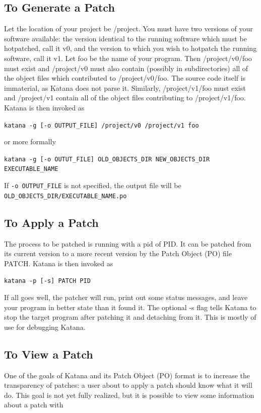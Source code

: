 \documentclass[11pt]{article}
\begin{document}
\subsection{To Generate a Patch}
\label{sec-6.2}

   Let the location of your project be /project. You must have two
   versions of your software available: the version identical to the
   running software which must be hotpatched, call it v0, and the
   version to which you wish to hotpatch the running software, call it
   v1. Let foo be the name of your program. Then /project/v0/foo must
   exist and /project/v0 must also contain (possibly in
   subdirectories) all of the object files which contributed to
   /project/v0/foo. The source code itself is immaterial, as Katana
   does not parse it. Similarly, /project/v1/foo must exist and
   /project/v1 contain all of the object files contributing to
   /project/v1/foo. Katana is then invoked as

   \texttt{katana -g [-o OUTPUT\_FILE] /project/v0 /project/v1 foo}

   or more formally

   \texttt{katana -g [-o OUTUT\_FILE] OLD\_OBJECTS\_DIR NEW\_OBJECTS\_DIR EXECUTABLE\_NAME}

   If \texttt{-o OUTPUT\_FILE} is not specified, the output file will be \texttt{OLD\_OBJECTS\_DIR/EXECUTABLE\_NAME.po}
\subsection{To Apply a Patch}
\label{sec-6.3}

   The process to be patched is running with a pid of PID. It can be
   patched from its current version to a more recent version by the
   Patch Object (PO) file PATCH. Katana is then invoked as

   \texttt{katana -p [-s] PATCH PID}

   If all goes well, the patcher will run, print out some status
   messages, and leave your program in better state than it found
   it. The optional -s flag tells Katana to stop the target program
   after patching it and detaching from it. This is mostly of use for
   debugging Katana.
\subsection{To View a Patch}
\label{sec-6.4}

   One of the goals of Katana and its Patch Object (PO) format is to
   increase the transparency of patches: a user about to apply a patch
   should know what it will do. This goal is not yet fully realized,
   but it is possible to view some information about a patch with
\end{document}
